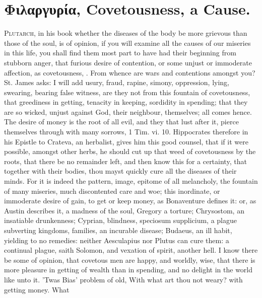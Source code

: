 {%
\section{\textgreek{Φιλαργυρία}, Covetousness, a Cause.}

\lettrine{P}{lutarch}, in his book whether the diseases of the body be more
grievous than those of the soul, is of opinion, if you will examine all
the causes of our miseries in this life, you shall find them most part
to have had their beginning from stubborn anger, that furious desire of
contention, or some unjust or immoderate affection, as covetousness,
\etc{}. From whence are wars and contentions amongst you? St. James
asks: I will add usury, fraud, rapine, simony, oppression, lying,
swearing, bearing false witness, \etc{} are they not from this fountain of
covetousness, that greediness in getting, tenacity in keeping,
sordidity in spending; that they are so wicked, unjust against
God, their neighbour, themselves; all comes hence. The desire of money
is the root of all evil, and they that lust after it, pierce themselves
through with many sorrows, 1 Tim. vi. 10. Hippocrates therefore in his
Epistle to Crateva, an herbalist, gives him this good counsel, that if
it were possible,  amongst other herbs, he should cut up that
weed of covetousness by the roots, that there be no remainder left, and
then know this for a certainty, that together with their bodies, thou
mayst quickly cure all the diseases of their minds. For it is indeed
the pattern, image, epitome of all melancholy, the fountain of many
miseries, much discontented care and woe; this inordinate, or
immoderate desire of gain, to get or keep money, as Bonaventure
defines it: or, as Austin describes it, a madness of the soul, Gregory
a torture; Chrysostom, an insatiable drunkenness; Cyprian, blindness,
speciosum supplicium, a plague subverting kingdoms, families, an
incurable disease; Budaeus, an ill habit, yielding to no
remedies: neither Aesculapius nor Plutus can cure them: a continual
plague, saith Solomon, and vexation of spirit, another hell. I know
there be some of opinion, that covetous men are happy, and worldly,
wise, that there is more pleasure in getting of wealth than in
spending, and no delight in the world like unto it. 'Twas Bias'
problem of old, With what art thou not weary? with getting money. What
}
